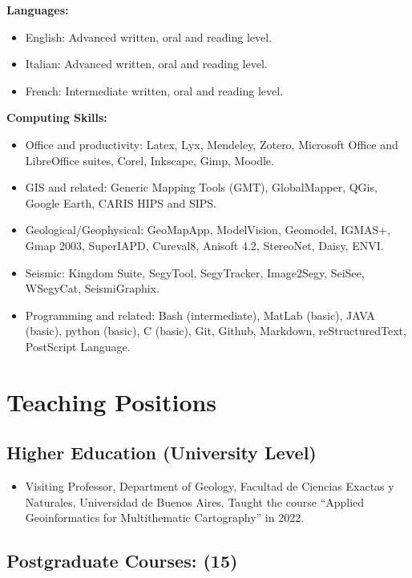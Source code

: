\documentclass[11pt, a4paper]{article}
\begin{document}
\textbf{Languages:}

\begin{itemize}
  \item English: Advanced written, oral and reading level.
  \item Italian: Advanced written, oral and reading level.
  \item French: Intermediate written, oral and reading level.
\end{itemize}

\textbf{Computing Skills:}

\begin{itemize}
  \item Office and productivity: Latex, Lyx, Mendeley, Zotero, Microsoft Office and LibreOffice suites, Corel, Inkscape, Gimp, Moodle.
  \item GIS and related: Generic Mapping Tools (GMT), GlobalMapper, QGis, Google Earth, CARIS HIPS and SIPS.
  \item Geological/Geophysical: GeoMapApp, ModelVision, Geomodel, IGMAS+, Gmap 2003, SuperIAPD, Cureval8, Anisoft 4.2, StereoNet, Daisy, ENVI.
  \item Seismic: Kingdom Suite, SegyTool, SegyTracker, Image2Segy, SeiSee, WSegyCat, SeismiGraphix.
  \item Programming and related: Bash (intermediate), MatLab (basic), JAVA (basic), python (basic), C (basic), Git, Github, Markdown, reStructuredText, PostScript Language.
\end{itemize}

\section{Teaching Positions}

\subsection{Higher Education (University Level)}

\begin{itemize}
  \item Visiting Professor, Department of Geology, Facultad de Ciencias Exactas y Naturales, Universidad de Buenos Aires. Taught the course “Applied Geoinformatics for Multithematic Cartography” in 2022.
\end{itemize}

\subsection{Postgraduate Courses: (15)}
\end{document}
